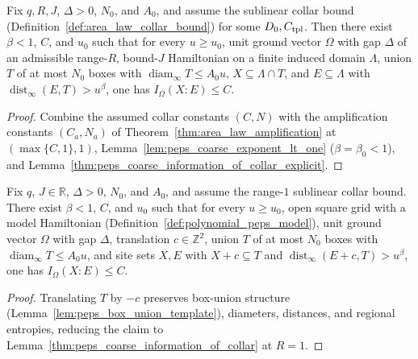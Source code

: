 \begin{lemma}
    \label{thm:peps_coarse_information_of_collar}
    \leanok
    Fix $q,R,J$, $\Delta>0$, $N_0$, and $A_0$, and assume the sublinear collar bound (Definition~\ref{def:area_law_collar_bound}) for some $D_0,C_{\rm tpl}$. Then there exist $\beta<1$, $C$, and $u_0$ such that for every $u\ge u_0$, unit ground vector $\Omega$ with gap $\Delta$ of an admissible range-$R$, bound-$J$ Hamiltonian on a finite induced domain $\Lambda$, union $T$ of at most $N_0$ boxes with $\operatorname{diam}_\infty T\le A_0u$, $X\subseteq\Lambda\cap T$, and $E\subseteq\Lambda$ with $\operatorname{dist}_\infty(E,T)>u^\beta$, one has $I_\Omega(X:E)\le C$.
\end{lemma}
\begin{proof}
    \leanok
    Combine the assumed collar constants $(C,N)$ with the amplification constants $(C_a,N_a)$ of Theorem~\ref{thm:area_law_amplification} at $(\max\{C,1\},1)$, Lemma~\ref{lem:peps_coarse_exponent_lt_one} ($\beta=\beta_0<1$), and Lemma~\ref{thm:peps_coarse_information_of_collar_explicit}.
\end{proof}

\begin{lemma}
    \label{thm:peps_coarse_information_square}
    \leanok
    Fix $q$, $J\in\mathbb R$, $\Delta>0$, $N_0$, and $A_0$, and assume the range-$1$ sublinear collar bound. There exist $\beta<1$, $C$, and $u_0$ such that for every $u\ge u_0$, open square grid with a model Hamiltonian (Definition~\ref{def:polynomial_peps_model}), unit ground vector $\Omega$ with gap $\Delta$, translation $c\in\mathbb Z^2$, union $T$ of at most $N_0$ boxes with $\operatorname{diam}_\infty T\le A_0u$, and site sets $X,E$ with $X+c\subseteq T$ and $\operatorname{dist}_\infty(E+c,T)>u^\beta$, one has $I_\Omega(X:E)\le C$.
\end{lemma}
\begin{proof}
    \leanok
    Translating $T$ by $-c$ preserves box-union structure (Lemma~\ref{lem:peps_box_union_template}), diameters, distances, and regional entropies, reducing the claim to Lemma~\ref{thm:peps_coarse_information_of_collar} at $R=1$.
\end{proof}

